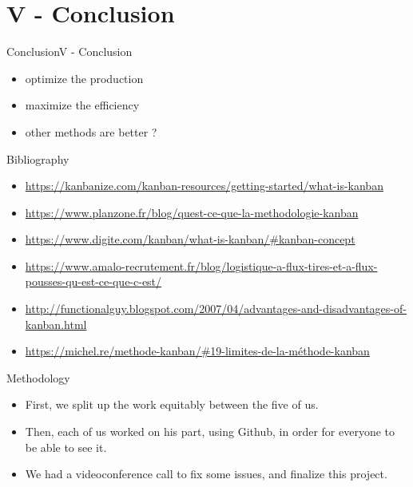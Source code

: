 \documentclass[10pt]{beamer}
\newcommand{\PV}{V - Conclusion}
\begin{document}
\section{\PV} 


\begin{frame}{Conclusion}{\PV}
    \begin{itemize}
        \item optimize the production
        \item maximize the efficiency
        \item other methods are better ?
    \end{itemize}
\end{frame}


\begin{frame}{Bibliography}
    \begin{itemize}
        \item \href{https://kanbanize.com/kanban-resources/getting-started/what-is-kanban}{https://kanbanize.com/kanban-resources/getting-started/what-is-kanban}
        \item \href{https://www.planzone.fr/blog/quest-ce-que-la-methodologie-kanban}{https://www.planzone.fr/blog/quest-ce-que-la-methodologie-kanban}
        \item \href{https://www.digite.com/kanban/what-is-kanban/\#kanban-concept}{https://www.digite.com/kanban/what-is-kanban/\#kanban-concept}
        \item \href{https://www.amalo-recrutement.fr/blog/logistique-a-flux-tires-et-a-flux-pousses-qu-est-ce-que-c-est/}{https://www.amalo-recrutement.fr/blog/logistique-a-flux-tires-et-a-flux-pousses-qu-est-ce-que-c-est/}
        \item \href{http://functionalguy.blogspot.com/2007/04/advantages-and-disadvantages-of-kanban.html}{http://functionalguy.blogspot.com/2007/04/advantages-and-disadvantages-of-kanban.html}
        \item \href{https://michel.re/methode-kanban/\#19-limites-de-la-méthode-kanban}{https://michel.re/methode-kanban/\#19-limites-de-la-méthode-kanban}
    \end{itemize}
\end{frame}


\begin{frame}{Methodology}
    \begin{itemize}
        \item First, we split up the work equitably between the five of us.
        \item Then, each of us worked on his part, using Github, in order for everyone to be able to see it.
        \item We had a videoconference call to fix some issues, and finalize this project.
    \end{itemize}
\end{frame}
\end{document}
